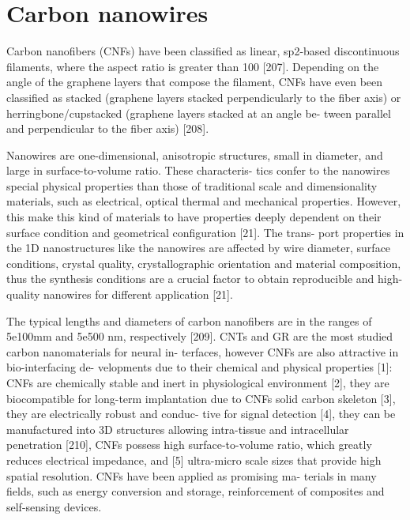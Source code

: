 \section{Carbon nanowires}

Carbon nanofibers (CNFs) have been classified as linear, sp2-based discontinuous filaments, where the aspect ratio is greater than 100 [207]. Depending on the angle of the graphene layers that compose the filament, CNFs have even been classified as stacked (graphene layers stacked perpendicularly to the fiber axis) or herringbone/cupstacked (graphene layers stacked at an angle be- tween parallel and perpendicular to the fiber axis) [208].

Nanowires are one-dimensional, anisotropic structures, small in diameter, and large in surface-to-volume ratio. These characteris- tics confer to the nanowires special physical properties than those of traditional scale and dimensionality materials, such as electrical, optical thermal and mechanical properties. However, this make this kind of materials to have properties deeply dependent on their surface condition and geometrical configuration [21]. The trans- port properties in the 1D nanostructures like the nanowires are affected by wire diameter, surface conditions, crystal quality, crystallographic orientation and material composition, thus the synthesis conditions are a crucial factor to obtain reproducible and high-quality nanowires for different application [21].

The typical lengths and diameters of carbon nanofibers are in the ranges of 5e100mm and 5e500 nm, respectively [209]. CNTs and GR are the most studied carbon nanomaterials for neural in- terfaces, however CNFs are also attractive in bio-interfacing de- velopments due to their chemical and physical properties [1]: CNFs are chemically stable and inert in physiological environment [2], they are biocompatible for long-term implantation due to CNFs solid carbon skeleton [3], they are electrically robust and conduc- tive for signal detection [4], they can be manufactured into 3D structures allowing intra-tissue and intracellular penetration [210], CNFs possess high surface-to-volume ratio, which greatly reduces electrical impedance, and [5] ultra-micro scale sizes that provide high spatial resolution. CNFs have been applied as promising ma- terials in many fields, such as energy conversion and storage, reinforcement of composites and self-sensing devices.

